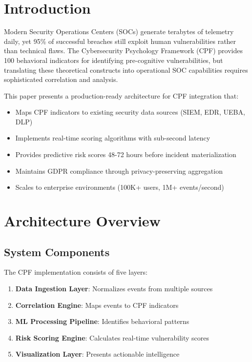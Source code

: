 \documentclass[11pt,a4paper]{article}
\begin{document}
\vspace{1cm}

\section{Introduction}

Modern Security Operations Centers (SOCs) generate terabytes of telemetry daily, yet 95\% of successful breaches still exploit human vulnerabilities rather than technical flaws. The Cybersecurity Psychology Framework (CPF) provides 100 behavioral indicators for identifying pre-cognitive vulnerabilities, but translating these theoretical constructs into operational SOC capabilities requires sophisticated correlation and analysis.

This paper presents a production-ready architecture for CPF integration that:
\begin{itemize}
\item Maps CPF indicators to existing security data sources (SIEM, EDR, UEBA, DLP)
\item Implements real-time scoring algorithms with sub-second latency
\item Provides predictive risk scores 48-72 hours before incident materialization
\item Maintains GDPR compliance through privacy-preserving aggregation
\item Scales to enterprise environments (100K+ users, 1M+ events/second)
\end{itemize}

\section{Architecture Overview}

\subsection{System Components}

The CPF implementation consists of five layers:

\begin{enumerate}
\item \textbf{Data Ingestion Layer}: Normalizes events from multiple sources
\item \textbf{Correlation Engine}: Maps events to CPF indicators
\item \textbf{ML Processing Pipeline}: Identifies behavioral patterns
\item \textbf{Risk Scoring Engine}: Calculates real-time vulnerability scores
\item \textbf{Visualization Layer}: Presents actionable intelligence
\end{enumerate}
\end{document}

